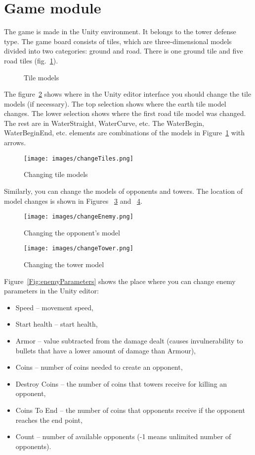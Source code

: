 
\section{Game module}

The game is made in the Unity environment. It belongs to the tower defense type. The game board consists of tiles, which are three-dimensional models divided into two categories: ground and road. There is one ground tile and five road tiles (fig.~\ref{Fig:tiles}).

\begin{figure}

\caption{Tile models}
\label{Fig:tiles}
\end{figure}  

The figure~\ref{Fig:changeTiles} shows where in the Unity editor interface you should change the tile models (if necessary). The top selection shows where the earth tile model changes. The lower selection shows where the first road tile model was changed. The rest are in WaterStraight, WaterCurve, etc. The WaterBegin, WaterBeginEnd, etc. elements are combinations of the models in Figure~\ref{Fig:tiles} with arrows.

\begin{figure}
\texttt{[image: images/changeTiles.png]}
\caption{Changing tile models}
\label{Fig:changeTiles}
\end{figure}  

Similarly, you can change the models of opponents and towers. The location of model changes is shown in Figures ~\ref{Fig:changeEnemy} and ~\ref{Fig:changeTower}.

\begin{figure}
\texttt{[image: images/changeEnemy.png]}
\caption{Changing the opponent's model}
\label{Fig:changeEnemy}
\end{figure}  


\begin{figure}
\texttt{[image: images/changeTower.png]}
\caption{Changing the tower model}
\label{Fig:changeTower}
\end{figure}  

Figure~\ref{Fig:enemyParameters} shows the place where you can change enemy parameters in the Unity editor:
\begin{itemize}
\item Speed -- movement speed,
\item Start health -- start health,
\item Armor -- value subtracted from the damage dealt (causes invulnerability to bullets that have a lower amount of damage than Armour),
\item Coins -- number of coins needed to create an opponent,
\item Destroy Coins -- the number of coins that towers receive for killing an opponent,
\item Coins To End -- the number of coins that opponents receive if the opponent reaches the end point,
\item Count -- number of available opponents (-1 means unlimited number of opponents).
\end{itemize}

